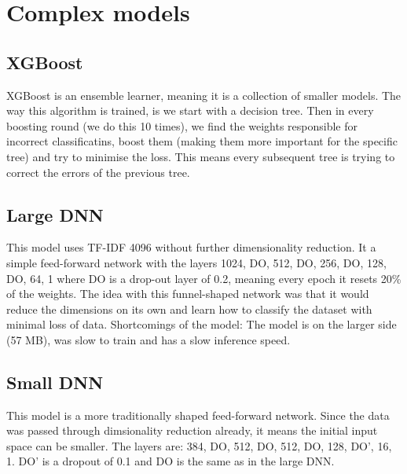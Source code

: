\section{Complex models}
\subsection{XGBoost}
XGBoost is an ensemble learner, meaning it is a collection of smaller models. The way this algorithm is trained, is we start with a decision tree. Then in every boosting round (we do this 10 times), we find the weights responsible for incorrect classificatins, boost them (making them more important for the specific tree) and try to minimise the loss. This means every subsequent tree is trying to correct the errors of the previous tree.

\subsection{Large DNN}
This model uses TF-IDF 4096 without further dimensionality reduction. It a simple feed-forward network with the layers 1024, DO, 512, DO, 256, DO, 128, DO, 64, 1 where DO is a drop-out layer of 0.2, meaning every epoch it resets 20\% of the weights. The idea with this funnel-shaped network was that it would reduce the dimensions on its own and learn how to classify the dataset with minimal loss of data. Shortcomings of the model: The model is on the larger side (57 MB), was slow to train and has a slow inference speed.

\subsection{Small DNN}
This model is a more traditionally shaped feed-forward network. Since the data was passed through dimsionality reduction
already, it means the initial input space can be smaller. The layers are: 384, DO, 512, DO, 512, DO, 128, DO', 16, 1.
DO' is a dropout of 0.1 and DO is the same as in the large DNN.

